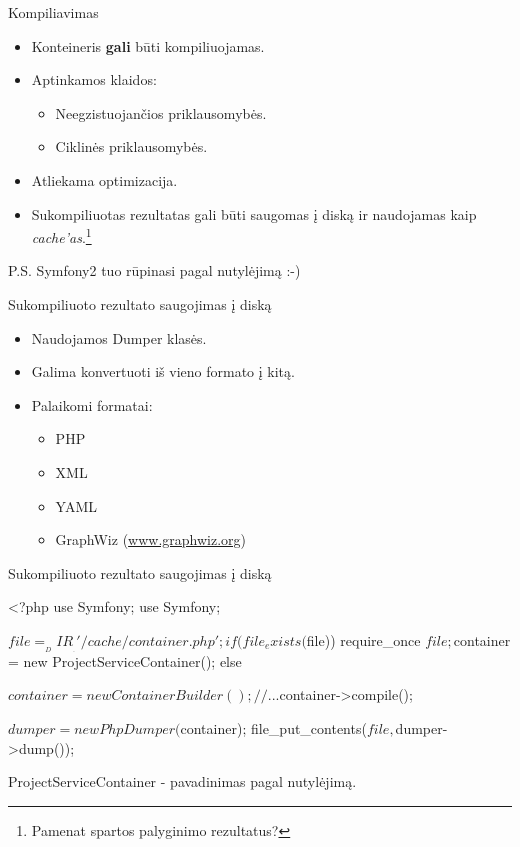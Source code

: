 \documentclass[12pt,a4paper]{beamer}
\begin{document}
\begin{frame}[fragile]{Kompiliavimas}
    \begin{itemize}
        \item Konteineris \textbf{gali} būti kompiliuojamas.
        \item Aptinkamos klaidos:
            \begin{itemize}
                \item Neegzistuojančios priklausomybės.
                \item Ciklinės priklausomybės.
            \end{itemize}
        \item Atliekama optimizacija.
        \item Sukompiliuotas rezultatas gali būti saugomas į diską ir naudojamas kaip \emph{cache'as}.\footnote{Pamenat spartos palyginimo rezultatus?}
    \end{itemize}
    \vskip0.5cm
    P.S. Symfony2 tuo rūpinasi pagal nutylėjimą :-)
\end{frame}

\begin{frame}[fragile]{Sukompiliuoto rezultato saugojimas į diską}
    \begin{itemize}
        \item Naudojamos Dumper klasės.
        \item Galima konvertuoti iš vieno formato į kitą.
        \item Palaikomi formatai:
            \begin{itemize}
                \item PHP
                \item XML
                \item YAML
                \item GraphWiz (\url{www.graphwiz.org})
            \end{itemize}
    \end{itemize}
\end{frame}

\begin{frame}[fragile]{Sukompiliuoto rezultato saugojimas į diską}
\begin{phpcode}
    <?php
    use Symfony\Component\DependencyInjection\ContainerBuilder;
    use Symfony\Component\DependencyInjection\Dumper\PhpDumper;

    $file = __DIR__ .'/cache/container.php';

    if (file_exists($file)) {
        require_once $file;
        $container = new ProjectServiceContainer();
    } else {
        $container = new ContainerBuilder();
        // ...
        $container->compile();

        $dumper = new PhpDumper($container);
        file_put_contents($file, $dumper->dump());
    }
\end{phpcode}
\vskip0.5cm
ProjectServiceContainer - pavadinimas pagal nutylėjimą.
\end{frame}
\end{document}

